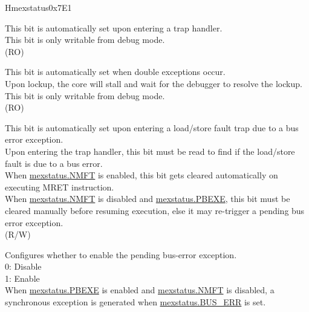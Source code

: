 \begin{register}{H}{mexstatus}{0x7E1}\label{regdesc:MEXSTATUS}%
%
%
%
%
%
%
%
%
%
%
%
%
%
\regnewline%
\begin{regdesc}\begin{reglist}
\label{fielddesc:MEXSTATUS_EXPT_VLD}\item [EXPT\_VLD] This bit is automatically set upon entering a trap handler. \\
This bit is only writable from debug mode.\\
(RO)
\label{fielddesc:MEXSTATUS_LOCKUP}\item [LOCKUP] This bit is automatically set when double exceptions occur.\\
Upon lockup, the core will stall and wait for the debugger to resolve the lockup. \\
This bit is only writable from debug mode.\\
(RO)
\label{fielddesc:MEXSTATUS_BUS_ERR}\item [BUS\_ERR] This bit is automatically set upon entering a load/store fault trap due to a bus error exception. \\
Upon entering the trap handler, this bit must be read to find if the load/store fault is due to a bus error.\\
When \hyperref[fielddesc:MEXSTATUS_NMFT]{mexstatus.NMFT} is enabled, this bit gets cleared automatically on executing MRET instruction.\\
When \hyperref[fielddesc:MEXSTATUS_NMFT]{mexstatus.NMFT} is disabled and \hyperref[fielddesc:MEXSTATUS_PBEXE]{mexstatus.PBEXE}, this bit must be cleared manually before resuming execution, else it may re-trigger a pending bus error exception.\\
(R/W)
\label{fielddesc:MEXSTATUS_PBEXE}\item [PBEXE] Configures whether to enable the pending bus-error exception. \\
0: Disable\\
1: Enable \\
When \hyperref[fielddesc:MEXSTATUS_PBEXE]{mexstatus.PBEXE} is enabled and \hyperref[fielddesc:MEXSTATUS_NMFT]{mexstatus.NMFT} is disabled, a synchronous exception is generated when \hyperref[fielddesc:MEXSTATUS_BUS_ERR]{mexstatus.BUS\_ERR} is set.\\

\end{reglist}
\end{regdesc}
\end{register}
